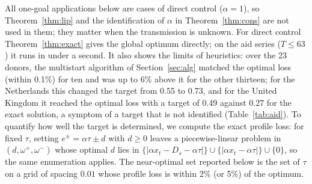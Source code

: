 \documentclass[11pt,a4paper]{article}
\theoremstyle{remark}\newtheorem{remark}{Remark}
\begin{document}
All one-goal applications below are cases of direct control ($\alpha=1$), so Theorem~\ref{thm:lip} and the identification of $\alpha$ in Theorem~\ref{thm:cons} are not used in them; they matter when the transmission is unknown. For direct control Theorem~\ref{thm:exact} gives the global optimum directly; on the aid series ($T\le63$) it runs in under a second. It also shows the limits of heuristics: over the 23 donors, the multistart algorithm of Section~\ref{sec:alg} matched the optimal loss (within 0.1\%) for ten and was up to 6\% above it for the other thirteen; for the Netherlands this changed the target from 0.55 to 0.73, and for the United Kingdom it reached the optimal loss with a target of 0.49 against 0.27 for the exact solution, a symptom of a target that is not identified (Table~\ref{tab:aid}). To quantify how well the target is determined, we compute the exact profile loss: for fixed $\tau$, setting $e^\pm=\alpha\tau\pm d$ with $d\ge0$ leaves a piecewise-linear problem in $(d,\omega^+,\omega^-)$ whose optimal $d$ lies in $\{|\alpha x_t-D_s-\alpha\tau|\}\cup\{|\alpha x_t-\alpha\tau|\}\cup\{0\}$, so the same enumeration applies. The near-optimal set reported below is the set of $\tau$ on a grid of spacing $0.01$ whose profile loss is within 2\% (or 5\%) of the optimum.
\end{document}
